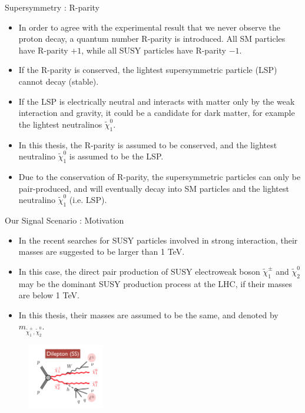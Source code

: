 \documentclass[mathserif,serif]{beamer}
\begin{document}
\begin{frame}{Supersymmetry : R-parity}
\begin{itemize}
\item In order to agree with the experimental result that we never observe the proton decay, a quantum number R-parity is introduced. All SM particles have R-parity $+1$, while all SUSY particles have R-parity $-1$.
\item If the R-parity is conserved, the lightest supersymmetric particle (LSP) cannot decay (stable).
\item If the LSP is electrically neutral and interacts with matter only by the weak interaction and gravity, it could be a candidate for dark matter, for example the lightest neutralinos $\tilde{\chi}_1^0$.
\item In this thesis, the R-parity is assumed to be conserved, and the lightest neutralino $\tilde{\chi}_1^0$ is assumed to be the LSP.
\item Due to the conservation of R-parity, the supersymmetric particles can only be pair-produced, and will eventually decay into SM particles and the lightest neutralino $\tilde{\chi}_1^0$ (i.e. LSP).
\end{itemize}
\end{frame}

\begin{frame}{Our Signal Scenario : Motivation}
\begin{itemize}
\item In the recent searches for SUSY particles involved in strong interaction, their masses are suggested to be larger than 1 TeV.
\item In this case, the direct pair production of SUSY electroweak boson $\tilde{\chi}_1^\pm$  and $\tilde{\chi}_2^0$ may be the dominant SUSY production process at the LHC, if their masses are below 1 TeV.
\item In this thesis, their masses are assumed to be the same, and denoted by $m_{\tilde{\chi}_1^\pm , \tilde{\chi}_2^0}$.
\end{itemize}
\begin{figure}
\centering
\includegraphics[width=0.3\textwidth]{data/photo/theory/signal_feynman.png}
\end{figure}
\end{frame}
\end{document}
